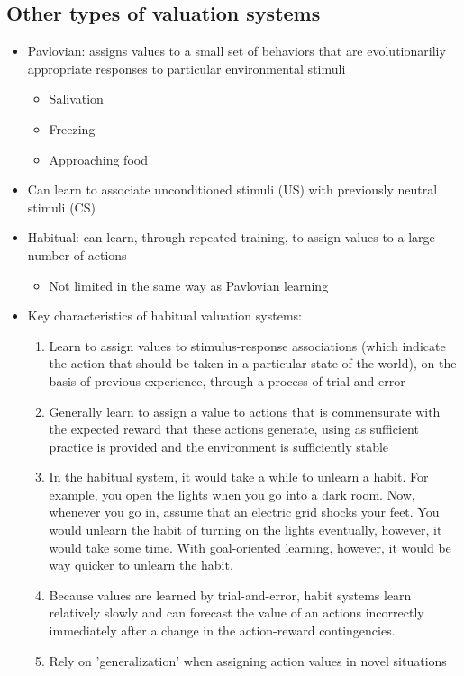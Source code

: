 \subsection{Other types of valuation systems}
\begin{itemize}
    \item Pavlovian: assigns values to a small set of behaviors that are evolutionariliy appropriate responses to particular environmental stimuli
    \begin{itemize}
        \item Salivation
        \item Freezing
        \item Approaching food
    \end{itemize}
    \item Can learn to associate unconditioned stimuli (US) with previously neutral stimuli (CS)
    \item Habitual: can learn, through repeated training, to assign values to a large number of actions
    \begin{itemize}
        \item Not limited in the same way as Pavlovian learning
    \end{itemize}
    \item Key characteristics of habitual valuation systems:
    \begin{enumerate}
        \item Learn to assign values to stimulus-response associations (which indicate the action that should be taken in a particular state of the world), on the basis of previous experience, through a process of trial-and-error
        \item Generally learn to assign a value to actions that is commensurate with the expected reward that these actions generate, using as sufficient practice is provided and the environment is sufficiently stable 
        \item In the habitual system, it would take a while to unlearn a habit. For example, you open the lights when you go into a dark room. Now, whenever you go in, assume that an electric grid shocks your feet. You would unlearn the habit of turning on the lights eventually, however, it would take some time. With goal-oriented learning, however, it would be way quicker to unlearn the habit.
    \item Because values are learned by trial-and-error, habit systems learn relatively slowly and can forecast the value of an actions incorrectly immediately after a change in the action-reward contingencies.
    \item Rely on 'generalization' when assigning action values in novel situations
    \end{enumerate}
   
\end{itemize}

